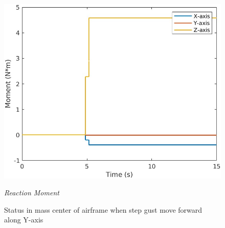 \begin{figure}[htbp]
\begin{minipage}[b]{0.3\textwidth}
    \centering
    \includegraphics[width=\textwidth]{Images/Gust/FIXED/3 moment_3.jpg}
    \caption*{\textit{Reaction Moment}}
  \end{minipage}
  \caption{Status in mass center of airframe when step gust move forward along Y-axis}
  \label{fig:fixed y}
\end{figure}
